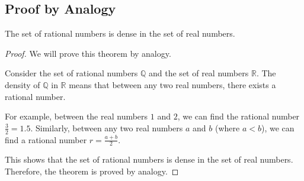 \subsection{Proof by Analogy}

    The set of rational numbers is dense in the set of real numbers.

\begin{proof}
    We will prove this theorem by analogy. 

    Consider the set of rational numbers \( \mathbb{Q} \) and the set of real numbers \( \mathbb{R} \). The density of \( \mathbb{Q} \) in \( \mathbb{R} \) means that between any two real numbers, there exists a rational number.

    For example, between the real numbers \( 1 \) and \( 2 \), we can find the rational number \( \frac{3}{2} = 1.5 \). Similarly, between any two real numbers \( a \) and \( b \) (where \( a < b \)), we can find a rational number \( r = \frac{a + b}{2} \).

    This shows that the set of rational numbers is dense in the set of real numbers.
    Therefore, the theorem is proved by analogy.    
\end{proof}
\newpage


